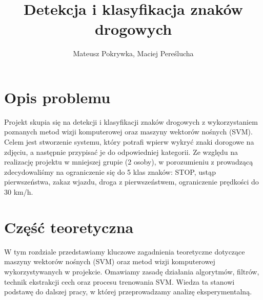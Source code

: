 \documentclass[12pt,oneside]{article}
\author{Mateusz Pokrywka, Maciej Pereślucha}
\title{Detekcja i klasyfikacja znaków drogowych}
\begin{document}
\maketitle

\tableofcontents
\clearpage

\section{Opis problemu}
Projekt skupia się na detekcji i klasyfikacji znaków drogowych z wykorzystaniem poznanych metod wizji komputerowej oraz maszyny wektorów nośnych (SVM). 
Celem jest stworzenie systemu, który potrafi wpierw wykryć znaki dorogowe na zdjęciu, a następnie przypisać je do odpowiedniej kategorii.
Ze względu na realizację projektu w mniejszej grupie (2 osoby), w porozumieniu z prowadzącą zdecydowaliśmy na ograniczenie się do 5 klas znaków: STOP, ustąp pierwszeństwa, zakaz wjazdu, droga z pierwszeństwem, ograniczenie prędkości do 30 km/h.
\section{Część teoretyczna}
W tym rozdziale przedstawiamy kluczowe zagadnienia teoretyczne dotyczące maszyny wektorów nośnych (SVM) oraz metod wizji komputerowej wykorzystywanych w projekcie.
Omawiamy zasadę działania algorytmów, filtrów, technik ekstrakcji cech oraz procesu trenowania SVM. 
Wiedza ta stanowi podstawę do dalszej pracy, w której przeprowadzamy analizę eksperymentalną.
\end{document}
